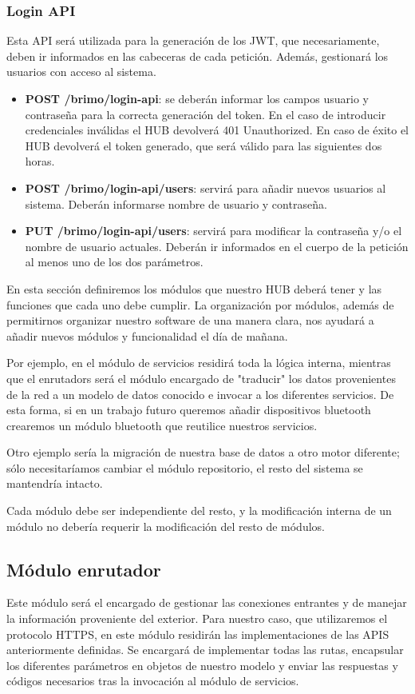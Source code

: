 \subsubsection{Login API}
Esta API será utilizada para la generación de los JWT, que necesariamente, deben ir informados en las cabeceras de cada petición. Además, gestionará
los usuarios con acceso al sistema.
\begin{itemize}
\item \textbf{POST /brimo/login-api}: se deberán informar los campos usuario y contraseña para la correcta generación del token. En el caso
de introducir credenciales inválidas el HUB devolverá 401 Unauthorized. En caso de éxito el HUB devolverá el token generado, que será válido
para las siguientes dos horas.
\item \textbf{POST /brimo/login-api/users}: servirá para añadir nuevos usuarios al sistema. Deberán informarse nombre de usuario y contraseña.
\item \textbf{PUT /brimo/login-api/users}: servirá para modificar la contraseña y/o el nombre de usuario actuales. Deberán ir informados en el
cuerpo de la petición al menos uno de los dos parámetros.
\end{itemize}

En esta sección definiremos los módulos que nuestro HUB deberá tener y las funciones que cada uno debe cumplir. La organización por módulos, además
de permitirnos organizar nuestro software de una manera clara, nos ayudará a añadir nuevos módulos y funcionalidad el día de mañana.
\par
Por ejemplo, en el módulo de servicios residirá toda la lógica interna, mientras que el enrutadors será el módulo encargado de "traducir" los datos
provenientes de la red a un modelo de datos conocido e invocar a los diferentes servicios. De esta forma, si en un trabajo futuro queremos añadir
dispositivos bluetooth crearemos un módulo bluetooth que reutilice nuestros servicios.
\par
Otro ejemplo sería la migración de nuestra base de datos a otro motor diferente; sólo necesitaríamos cambiar el módulo repositorio, el resto del sistema
se mantendría intacto.
\par
Cada módulo
debe ser independiente del resto, y la modificación interna de un módulo no debería requerir la modificación del resto de módulos.
\subsection{Módulo enrutador}
Este módulo será el encargado de gestionar las conexiones entrantes y de manejar la información proveniente del exterior. Para nuestro caso, que utilizaremos
el protocolo HTTPS, en este módulo residirán las implementaciones de las APIS anteriormente definidas. Se encargará de implementar todas las rutas, encapsular
los diferentes parámetros en objetos de nuestro modelo y enviar las respuestas y códigos necesarios tras la invocación al módulo de servicios.

